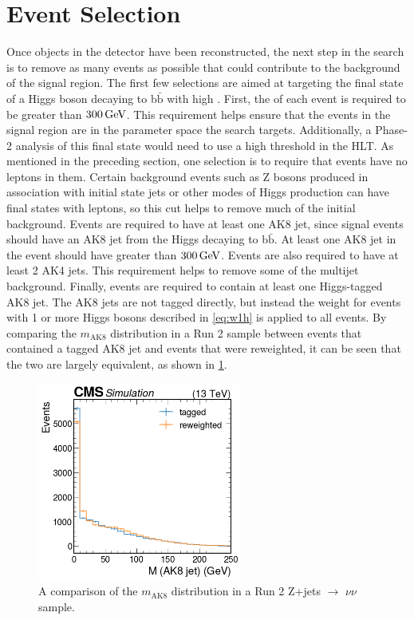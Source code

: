 \section{Event Selection}
Once objects in the detector have been reconstructed, the next step in the search is to remove as many events as possible that could contribute to the background of the signal region. The first few selections are aimed at targeting the final state of a Higgs boson decaying to b$\bar{\mathrm{b}}$ with high \ptmiss. First, the \ptmiss of each event is required to be greater than $\GeV{300}$. This requirement helps ensure that the events in the signal region are in the parameter space the search targets. Additionally, a Phase-2 analysis of this final state would need to use a high \ptmiss threshold in the HLT. As mentioned in the preceding section, one selection is to require that events have no leptons in them. Certain background events such as Z bosons produced in association with initial state jets or other modes of Higgs production can have final states with leptons, so this cut helps to remove much of the initial background. Events are required to have at least one AK8 jet, since signal events should have an AK8 jet from the Higgs decaying to b$\bar{\mathrm{b}}$. At least one AK8 jet in the event should have \pt greater than $\GeV{300}$. Events are also required to have at least 2 AK4 jets. This requirement helps to remove some of the multijet background. Finally, events are required to contain at least one Higgs-tagged AK8 jet. The AK8 jets are not tagged directly, but instead the weight for events with 1 or more Higgs bosons described in \cref{eq:w1h} is applied to all events. By comparing the $m_\text{AK8}$ distribution in a Run 2 sample between events that contained a tagged AK8 jet and events that were reweighted, it can be seen that the two are largely equivalent, as shown in \cref{fig:tagcheck}.

\begin{figure}[ht]
\centering
\includegraphics[width=0.6\textwidth]{Chapters/Strategy/tagcheck.png}
\caption{A comparison of the $m_\text{AK8}$ distribution in a Run 2 Z+jets $\to$ $\nu\nu$ sample.}
\label{fig:tagcheck}
\end{figure}

